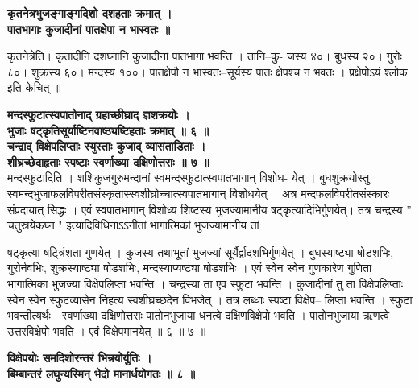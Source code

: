 \documentclass[11pt, openany]{book}
\begin{document}
{{{{\vspace{2mm}
\centering
\textbf{
 कृतनेत्रभुजङ्गाङ्गदिशो दशहताः क्रमात् ।\\
 \hspace{0.8cm}
 पातभागाः कुजादीनां पातक्षेपा न भास्वतः ॥}

\vspace{2mm}
\justifying
 कृतनेत्रेति। कृतादीनि दशघ्नानि कुजादीनां पातभागा भवन्ति ।
तानि--कु-
जस्य ४०। बुधस्य २०। गुरोः ८०। शुक्रस्य ६०। मन्दस्य १००।
पातक्षेपौ
न भास्वतः--सूर्यस्य पातः क्षेपश्च न भवतः । प्रक्षेपोऽयं
श्लोक इति केचित् ॥

\vspace{2mm}
\centering
\textbf{
 मन्दस्फुटात्स्वपातोनाद् ग्रहाच्छीघ्राद् ज्ञशक्रयोः ।\\
 \hspace{1mm}
 भुजाः षट्कृतिसूर्याष्टिनवाष्ठ्यष्टिहताः क्रमात् ॥ ६ ॥\\
\hspace{5mm}
 चन्द्राद् विक्षेपलिप्ताः स्युस्ताः कुजाद् व्यासताडिताः ।\\
 \hspace{8mm}
 शीघ्रच्छेदाहृताः स्पष्टाः स्वर्णाख्या दक्षिणोत्तराः ॥ ७ ॥}\\

\vspace{2mm}
\justifying
 मन्दस्फुटादिति । शशिकुजगुरुमन्दानां स्वमन्दस्फुटात्स्वपातभागान्
विशोध-
येत् । बुधशुक्रयोस्तु
स्वमन्दभुजाफलविपरीतसंस्कृतास्स्वशीघ्रोच्चात्स्वपातभागान्
विशोधयेत् । अत्र मन्दफलविपरीतसंस्कारः संप्रदायात् सिद्धः । एवं
स्वपातभागान्
विशोध्य शिष्टस्य भुजज्यामानीय षट्कृत्यादिभिर्गुणयेत्। तत्र
चन्द्रस्य
 '' चतुस्रयेकघ्न " इत्यादिविधिनाऽऽनीतां भागात्मिकां भुजज्यामानीय तां

\newpage
\thispagestyle{fancy}
\fancyhf{}
\lhead{[ग्रहणाधिकारः]}
\justifying
\noindent
षट्कृत्या  षट्त्रिंशता  गुणयेत् । कुजस्य तथाभूतां भुजज्यां
सूर्यैर्द्वादशभिर्गुणयेत् ।
बुधस्याष्ट्या षोडशभिः, गुरोर्नवभिः, शुक्रस्याष्ट्या षोडशभिः,
मन्दस्याप्यष्ट्या
षोडशभिः । एवं स्वेन स्वेन गुणकारेण गुणिता भागात्मिका भुजज्या
विक्षेपलिप्ता
भवन्ति । चन्द्रस्या ता एव स्फुटा भवन्ति । कुजादीनां तु ता
विक्षेपलिप्ताः स्वेन
स्वेन स्फुटव्यासेन निहत्य स्वशीघ्रच्छदेन विभजेत् । तत्र लब्धाः
स्पष्टा विक्षेप--
लिप्ता भवन्ति । स्फुटा भवन्तीत्यर्थः। स्वर्णाख्या दक्षिणोत्तराः
पातोनभुजाया
धनत्वे दक्षिणविक्षेपो भवति । पातोनभुजाया ऋणत्वे उत्तरविक्षेपो भवति
। एवं
विक्षेपमानयेत् ॥ ६ ॥ ७ ॥

\vspace{2mm}
\textbf{
\centering
 विक्षेपयोः समदिशोरन्तरं भिन्नयोर्युतिः ।\\
 \hspace{3cm}
 बिम्बान्तरं लघुन्यस्मिन् भेदो मानार्धयोगतः ॥ ८ ॥}

}}}}
\end{document}
